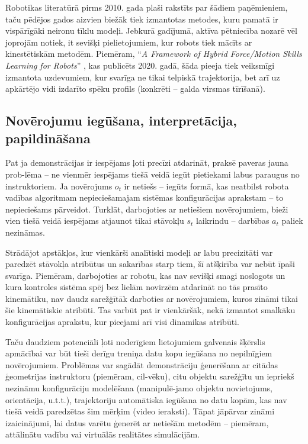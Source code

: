 \documentclass[12pt, a4paper]{article}
\numberwithin{equation}{section} %
\begin{document}
Robotikas literatūrā pirms 2010. gada \cite{billard2008handbook} plaši rakstīts par šādiem paņēmieniem, taču pēdējos gados aizvien biežāk tiek izmantotas metodes, kuru pamatā ir vispārīgāki neironu tīklu modeļi. Jebkurā gadījumā, aktīva pētniecība nozarē vēl joprojām notiek, it sevišķi pielietojumiem, kur robots tiek mācīts ar kinestētiskām metodēm. Piemēram, ``\textit{A Framework of Hybrid Force/Motion Skills Learning for Robots}'' \cite{wang2020framework}, kas publicēts 2020. gadā, šāda pieeja tiek veiksmīgi izmantota uzdevumiem, kur svarīga ne tikai telpiskā trajektorija, bet arī uz apkārtējo vidi izdarīto spēku profils (konkrēti -- galda virsmas tīrīšanā).

\subsection{Novērojumu iegūšana, interpretācija, papildināšana}

Pat ja demonstrācijas ir iespējams ļoti precīzi atdarināt, praksē paveras jauna prob-lēma -- ne vienmēr iespējams tiešā veidā iegūt pietiekami labus paraugus no instruktoriem. Ja novērojums $o_t$ ir netiešs -- iegūts formā, kas neatbilst robota vadības algoritmam nepieciešamajam sistēmas konfigurācijas aprakstam -- to nepieciešams pārveidot. Turklāt, darbojoties ar netiešiem novērojumiem, bieži vien tiešā veidā iespējams atjaunot tikai stāvokļu $s_t$ laikrindu -- darbības $a_t$ paliek nezināmas.

Strādājot apstākļos, kur vienkārši analītiski modeļi ar labu precizitāti var paredzēt stāvokļa atribūtus un sakarības starp tiem, šī atšķirība var nebūt īpaši svarīga. Piemēram, darbojoties ar robotu, kas nav sevišķi smagi noslogots un kura kontroles sistēma spēj bez lielām novirzēm atdarināt no tās prasīto kinemātiku, nav daudz sarežģītāk darboties ar novērojumiem, kuros zināmi tikai šie kinemātiskie atribūti. Tas varbūt pat ir vienkāršāk, nekā izmantot smalkāku konfigurācijas aprakstu, kur pieejami arī visi dinamikas atribūti. 

Taču daudziem potenciāli ļoti noderīgiem lietojumiem galvenais šķērslis apmācībai var būt tieši derīgu treniņa datu kopu iegūšana no nepilnīgiem novērojumiem. Problēmas var sagādāt demonstrāciju ģenerēšana ar citādas ģeometrijas instruktoru (piemēram, cil-vēku), citu objektu sarežģītu un iepriekš nezināmu konfigurāciju modelēšana (manipulē-jamo objektu novietojums, orientācija, u.t.t.), trajektoriju automātiska iegūšana no datu kopām, kas nav tiešā veidā paredzētas šim mērķim (video ieraksti). Tāpat jāpārvar zināmi izaicinājumi, lai datus varētu ģenerēt ar netiešām metodēm -- piemēram, attālinātu vadību vai virtuālās realitātes simulācijām.
\end{document}
